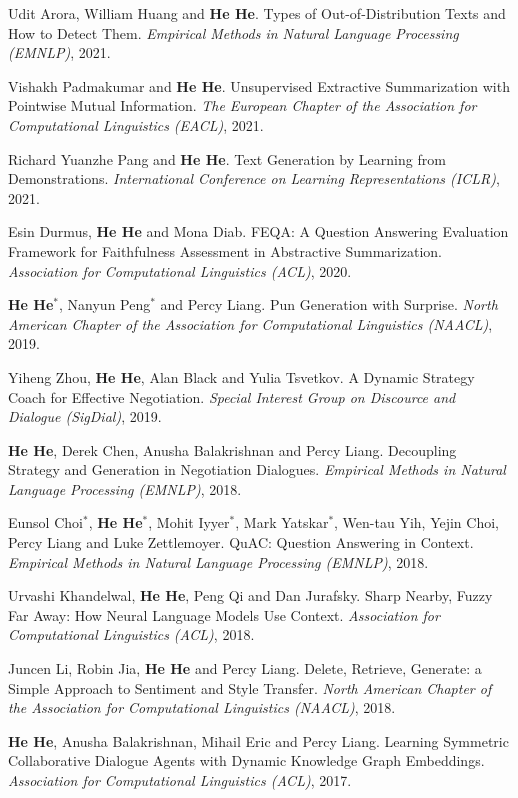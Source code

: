Udit Arora, William Huang and \textbf{He He}. Types of Out-of-Distribution Texts and How to Detect Them. \textit{Empirical Methods in Natural Language Processing (EMNLP)}, 2021.

Vishakh Padmakumar and \textbf{He He}. Unsupervised Extractive Summarization with Pointwise Mutual Information. \textit{The European Chapter of the Association for Computational Linguistics (EACL)}, 2021.

Richard Yuanzhe Pang and \textbf{He He}. Text Generation by Learning from Demonstrations. \textit{International Conference on Learning Representations (ICLR)}, 2021.

Esin Durmus, \textbf{He He} and Mona Diab. FEQA: A Question Answering Evaluation Framework for Faithfulness Assessment in Abstractive Summarization. \textit{Association for Computational Linguistics (ACL)}, 2020.

\textbf{He He}$^*$, Nanyun Peng$^*$ and Percy Liang. Pun Generation with Surprise. \textit{North American Chapter of the Association for Computational Linguistics (NAACL)}, 2019.

Yiheng Zhou, \textbf{He He}, Alan Black and Yulia Tsvetkov. A Dynamic Strategy Coach for Effective Negotiation. \textit{Special Interest Group on Discource and Dialogue (SigDial)}, 2019.

\textbf{He He}, Derek Chen, Anusha Balakrishnan and Percy Liang. Decoupling Strategy and Generation in Negotiation Dialogues. \textit{Empirical Methods in Natural Language Processing (EMNLP)}, 2018.

Eunsol Choi$^*$, \textbf{He He}$^*$, Mohit Iyyer$^*$, Mark Yatskar$^*$, Wen-tau Yih, Yejin Choi, Percy Liang and Luke Zettlemoyer. QuAC: Question Answering in Context. \textit{Empirical Methods in Natural Language Processing (EMNLP)}, 2018.

Urvashi Khandelwal, \textbf{He He}, Peng Qi and Dan Jurafsky. Sharp Nearby, Fuzzy Far Away: How Neural Language Models Use Context. \textit{Association for Computational Linguistics (ACL)}, 2018.

Juncen Li, Robin Jia, \textbf{He He} and Percy Liang. Delete, Retrieve, Generate: a Simple Approach to Sentiment and Style Transfer. \textit{North American Chapter of the Association for Computational Linguistics (NAACL)}, 2018.

\textbf{He He}, Anusha Balakrishnan, Mihail Eric and Percy Liang. Learning Symmetric Collaborative Dialogue Agents with Dynamic Knowledge Graph Embeddings. \textit{Association for Computational Linguistics (ACL)}, 2017.

